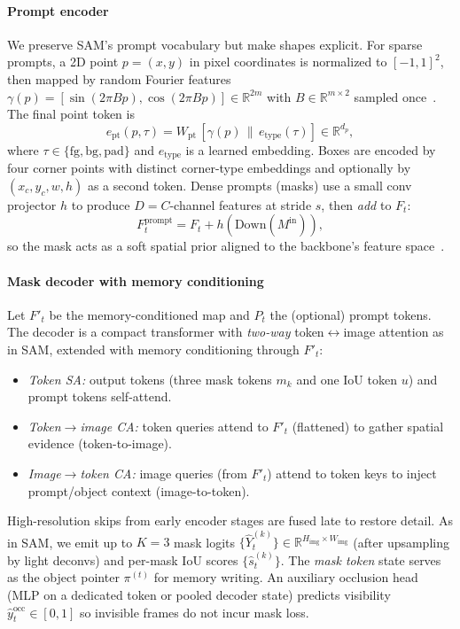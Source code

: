 \begin{enrichment}
\begin{enrichment}
		\paragraph{Prompt encoder}
		We preserve SAM’s prompt vocabulary but make shapes explicit. For sparse prompts, a 2D point $p\!=\!(x,y)$ in pixel coordinates is normalized to $[-1,1]^2$, then mapped by random Fourier features $\gamma(p)\!=\![\sin(2\pi Bp),\cos(2\pi Bp)]\in\mathbb{R}^{2m}$ with $B\in\mathbb{R}^{m\times 2}$ sampled once~\cite{tancik2020_fourierfeatures}. The final point token is
		\[
		e_{\text{pt}}(p,\tau)=W_{\text{pt}}\,[\gamma(p)\,\|\,e_{\text{type}}(\tau)]\in\mathbb{R}^{d_p},
		\]
		where $\tau\in\{\text{fg},\text{bg},\text{pad}\}$ and $e_{\text{type}}$ is a learned embedding. Boxes are encoded by four corner points with distinct corner-type embeddings and optionally by $(x_c,y_c,w,h)$ as a second token. Dense prompts (masks) use a small conv projector $h$ to produce $D\!=\!C$-channel features at stride $s$, then \emph{add} to $F_t$:
		\[
		F_t^{\text{prompt}} = F_t + h(\text{Down}(M^{\text{in}})),
		\]
		so the mask acts as a soft spatial prior aligned to the backbone’s feature space~\cite{kirillov2023_sam}.
		
		\paragraph{Mask decoder with memory conditioning}
		Let $F'_t$ be the memory-conditioned map and $P_t$ the (optional) prompt tokens. The decoder is a compact transformer with \emph{two-way} token$\leftrightarrow$image attention as in SAM, extended with memory conditioning through $F'_t$:
		\begin{itemize}
			\item \emph{Token SA:} output tokens (three mask tokens $m_k$ and one IoU token $u$) and prompt tokens self-attend.
			\item \emph{Token$\rightarrow$image CA:} token queries attend to $F'_t$ (flattened) to gather spatial evidence (token-to-image).
			\item \emph{Image$\rightarrow$token CA:} image queries (from $F'_t$) attend to token keys to inject prompt/object context (image-to-token).
		\end{itemize}
		High-resolution skips from early encoder stages are fused late to restore detail. As in SAM, we emit up to $K\!=\!3$ mask logits $\{\hat{Y}_{t}^{(k)}\}\in\mathbb{R}^{H_\text{img}\times W_\text{img}}$ (after upsampling by light deconvs) and per-mask IoU scores $\{\hat{s}^{(k)}_t\}$. The \emph{mask token} state serves as the object pointer $\pi^{(t)}$ for memory writing. An auxiliary occlusion head (MLP on a dedicated token or pooled decoder state) predicts visibility $\hat{y}^{\text{occ}}_t\in[0,1]$ so invisible frames do not incur mask loss.
		

\end{enrichment}
\end{enrichment}
